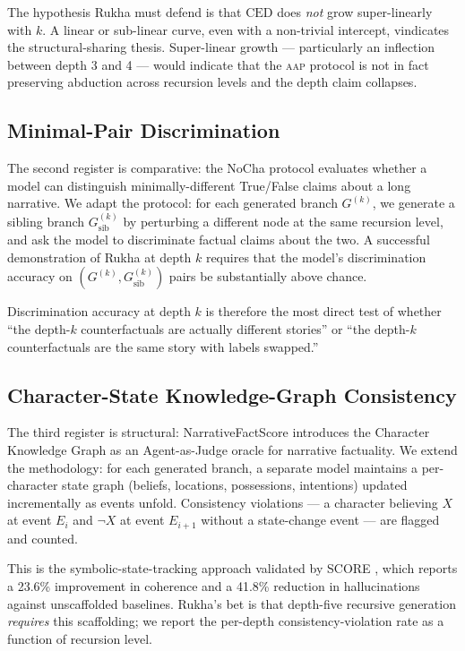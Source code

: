 \documentclass[11pt]{article}
\theoremstyle{rukha}
\begin{document}
The hypothesis Rukha must defend is that $\text{CED}$ does \emph{not}
grow super-linearly with $k$. A linear or sub-linear curve, even with a
non-trivial intercept, vindicates the structural-sharing thesis.
Super-linear growth --- particularly an inflection between depth 3 and 4
--- would indicate that the \textsc{aap} protocol is not in fact
preserving abduction across recursion levels and the depth claim
collapses.

\subsection{Minimal-Pair Discrimination}

The second register is comparative: the NoCha protocol
\cite{nocha} evaluates whether a model can distinguish minimally-different
True/False claims about a long narrative. We adapt the protocol: for
each generated branch $G^{(k)}$, we generate a sibling branch $G^{(k)}_{\text{sib}}$
by perturbing a different node at the same recursion level, and ask the
model to discriminate factual claims about the two. A successful
demonstration of Rukha at depth $k$ requires that the model's
discrimination accuracy on $(G^{(k)}, G^{(k)}_{\text{sib}})$ pairs be
substantially above chance.

Discrimination accuracy at depth $k$ is therefore the most direct test
of whether ``the depth-$k$ counterfactuals are actually different
stories'' or ``the depth-$k$ counterfactuals are the same story with
labels swapped.''

\subsection{Character-State Knowledge-Graph Consistency}

The third register is structural: NarrativeFactScore \cite{narrativefactscore}
introduces the Character Knowledge Graph as an Agent-as-Judge oracle for
narrative factuality. We extend the methodology: for each generated
branch, a separate model maintains a per-character state graph
(beliefs, locations, possessions, intentions) updated incrementally as
events unfold. Consistency violations --- a character believing $X$ at
event $E_i$ and $\neg X$ at event $E_{i+1}$ without a state-change
event --- are flagged and counted.

This is the symbolic-state-tracking approach validated by SCORE
\cite{scorestory}, which reports a 23.6\% improvement in coherence and a
41.8\% reduction in hallucinations against unscaffolded baselines.
Rukha's bet is that depth-five recursive generation \emph{requires}
this scaffolding; we report the per-depth consistency-violation rate as
a function of recursion level.
\end{document}
